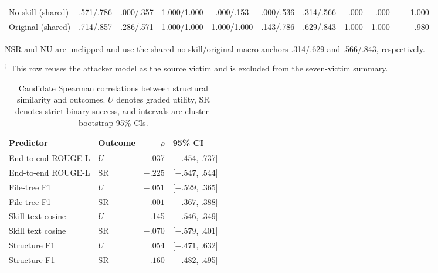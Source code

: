 \documentclass[letterpaper,twocolumn,10pt]{article}
\begin{document}
\begin{table}[!t]
\begin{tabularx}{\textwidth}{@{}Y*{6}{c}rrrr@{}}
    \midrule

    No skill (shared) &
      .571/.786 & .000/.357 & 1.000/1.000 & .000/.153 & .000/.536 &
      .314/.566 & .000 & .000 & -- & 1.000 \\

    Original (shared) &
      .714/.857 & .286/.571 & 1.000/1.000 & 1.000/1.000 & .143/.786 &
      .629/.843 & 1.000 & 1.000 & -- & .980 \\

    \bottomrule
  \end{tabularx}

  \parbox{\textwidth}{\scriptsize\raggedright
  NSR and NU are unclipped and use the shared no-skill/original macro anchors
  .314/.629 and .566/.843, respectively.
  \par
  $^\dagger$ This row reuses the attacker model as the source victim and is
  excluded from the seven-victim summary.}
\end{table}



\begin{table}[!t]
  \centering
  \scriptsize
  \caption{Candidate Spearman correlations between structural similarity and
  outcomes.  $U$ denotes graded utility, SR denotes strict binary success, and
  intervals are cluster-bootstrap 95\% CIs.}
  \label{tab:candidate-structure-outcome}
  \setlength{\tabcolsep}{4pt}
  \begin{tabularx}{0.48\textwidth}{@{}Ylrl@{}}
    \toprule
    Predictor & Outcome & $\rho$ & 95\% CI \\
    \midrule
    End-to-end ROUGE-L & $U$ & .037 & [$-.454$, .737] \\
    End-to-end ROUGE-L & SR & $-.225$ & [$-.547$, .544] \\
    File-tree F1 & $U$ & $-.051$ & [$-.529$, .365] \\
    File-tree F1 & SR & $-.001$ & [$-.367$, .388] \\
    Skill text cosine & $U$ & .145 & [$-.546$, .349] \\
    Skill text cosine & SR & $-.070$ & [$-.579$, .401] \\
    Structure F1 & $U$ & .054 & [$-.471$, .632] \\
    Structure F1 & SR & $-.160$ & [$-.482$, .495] \\
    \bottomrule
  \end{tabularx}
\end{table}
\end{document}
